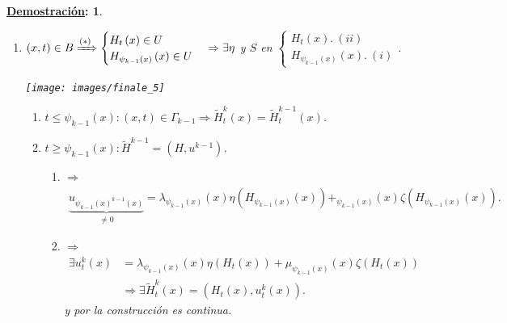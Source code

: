 \documentclass[10pt,a4paper,openright]{book}
\theoremstyle{break}
\newtheorem*{demo}{\underline{Demostración}:}
\begin{document}
\begin{demo}
\begin{enumerate}
    \item $\left( x, t \right) \in B \xRightarrow{(*)} \begin{cases}
        H_t\left( x \right) \in U\\
        H_{\psi_{k - 1} \left( x \right)} \left( x \right) \in U
    \end{cases} \Rightarrow \exists \eta$ y $S$ en $\begin{cases}
        H_t\left( x \right).\ (ii)\\
        H_{\psi_{k - 1} \left( x \right)} \left( x \right).\ (i)
    \end{cases}$.
    \begin{center}
        \texttt{[image: images/finale\_5]} 
    \end{center}
    \begin{enumerate}
        \item $t \le \psi_{k - 1} \left( x \right) : \left( x, t \right) \in \Gamma_{k - 1} \Rightarrow \tilde{H}_t^k \left( x \right) = \tilde{H}_t^{k - 1} \left( x \right)$.
        \item $t \ge \psi_{k - 1} \left( x \right) : \tilde{H}^{k - 1} = \left( H, u^{k - 1} \right)$.
        \begin{enumerate}
            \item[(i)] $\Rightarrow$
            \begin{align*}
            \underbrace{u_{\psi_{k-1} \left( x \right)^{k - 1} \left( x \right)}}_{\neq 0} = \lambda_{\psi_{k - 1} \left( x \right)} \left( x \right) \eta\left( H_{\psi_{k - 1}\left( x \right)} \left( x \right) \right) + _{\psi_{k - 1} \left( x \right)} \left( x \right) \zeta\left( H_{\psi_{k - 1}\left( x \right)} \left( x \right) \right) 
            .\end{align*}
            \item[(ii)] $\Rightarrow$
            \begin{align*}
                \exists u_t^k\left( x \right) &= \lambda_{\psi_{k-1}\left( x \right)} \left( x \right) \eta\left( H_t\left( x \right) \right) + \mu_{\psi_{k - 1} \left( x \right)} \left( x \right) \zeta\left( H_t\left( x \right) \right) \\
                &\Rightarrow \exists \tilde{H}_t^k\left( x \right) = \left( H_t\left( x \right), u_t^k\left( x \right) \right)
            .\end{align*}
            y por la construcción es continua.
        \end{enumerate}


\end{enumerate}
\end{enumerate}
\end{demo}
\end{document}
